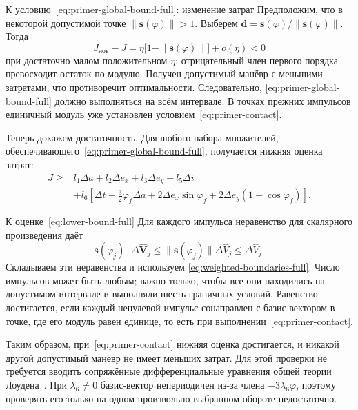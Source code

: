 \begin{explanation}{К условию~\eqref{eq:primer-global-bound-full}: изменение затрат}
Предположим, что в некоторой допустимой точке
$\|\boldsymbol s(\varphi)\|>1$. Выберем
$\boldsymbol d=\boldsymbol s(\varphi)/\|\boldsymbol s(\varphi)\|$.
Тогда
\[
 J_{\text{нов}}-J
 =\eta\bigl[1-\|\boldsymbol s(\varphi)\|\bigr]+o(\eta)<0
\]
при достаточно малом положительном $\eta$:
отрицательный член первого порядка превосходит остаток по модулю.
Получен допустимый манёвр с меньшими затратами, что противоречит
оптимальности. Следовательно,
\eqref{eq:primer-global-bound-full} должно выполняться на всём
интервале. В точках прежних импульсов единичный модуль уже
установлен условием~\eqref{eq:primer-contact}.
\end{explanation}

Теперь докажем достаточность. Для любого набора множителей,
обеспечивающего~\eqref{eq:primer-global-bound-full},
получается нижняя оценка затрат:
\begin{equation}
\begin{aligned}
 J\geq{}&l_1\Delta a+l_2\Delta e_x+l_3\Delta e_y+l_5\Delta i\\
       &+l_6\left[\Delta t-\frac32\varphi_f\Delta a
          +2\Delta e_x\sin\varphi_f+2\Delta e_y(1-\cos\varphi_f)\right].
\end{aligned}
\label{eq:lower-bound-full}
\end{equation}
\begin{explanation}{К оценке~\eqref{eq:lower-bound-full}}
Для каждого импульса неравенство для скалярного произведения даёт
\[
 \boldsymbol s(\varphi_j)\cdot\Delta\widehat{\boldsymbol V}_j
 \leq\|\boldsymbol s(\varphi_j)\|\Delta\widehat V_j
 \leq\Delta\widehat V_j.
\]
Складываем эти неравенства и используем
\eqref{eq:weighted-boundaries-full}. Число импульсов может быть
любым; важно только, чтобы все они находились на допустимом
интервале и выполняли шесть граничных условий.
Равенство достигается, если каждый ненулевой импульс сонаправлен
с базис-вектором в точке, где его модуль равен единице,
то есть при выполнении~\eqref{eq:primer-contact}.
\end{explanation}

Таким образом, при~\eqref{eq:primer-contact} нижняя оценка
достигается, и никакой другой допустимый манёвр не имеет
меньших затрат. Для этой проверки не требуется вводить сопряжённые
дифференциальные уравнения общей теории Лоудена~\cite{lawden}.
При $\lambda_6\ne0$ базис-вектор непериодичен из-за члена
$-3\lambda_6\varphi$, поэтому проверять его только на одном
произвольно выбранном обороте недостаточно.

